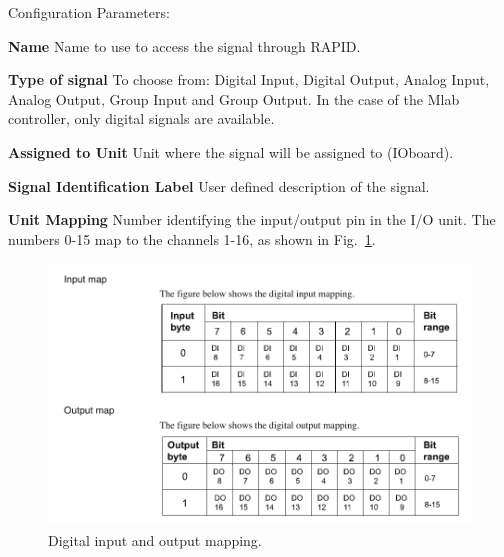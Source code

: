 \documentclass[letterpaper,notitlepage,10pt]{article}
\begin{document}
Configuration Parameters:
\begin{description}
\item \textbf{Name} Name to use to access the signal through RAPID.
\item \textbf{Type of signal} To choose from: Digital Input, Digital
  Output, Analog Input, Analog Output, Group Input and Group
  Output. In the case of the Mlab controller, only digital signals are
  available.
\item \textbf{Assigned to Unit} Unit where the signal will be assigned
  to (IOboard).
\item \textbf{Signal Identification Label} User defined description of
  the signal.
\item \textbf{Unit Mapping} Number identifying the input/output pin in
  the I/O unit. The numbers 0-15 map to the channels 1-16, as shown in
  Fig.~\ref{fig:mapping}.
%
\begin{figure}[h]
	\centering
		\includegraphics[width=5in]{figures/mapping}
                \caption{Digital input and output mapping.}
	\label{fig:mapping}
\end{figure}
%
\end{description}


%

\end{document}
